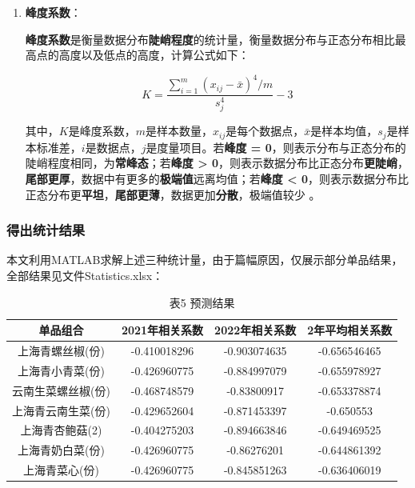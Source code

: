 \documentclass{article}
\begin{document}
\begin{enumerate}
		\item \textbf{峰度系数}：
		
		\textbf{峰度系数}是衡量数据分布\textbf{陡峭程度}的统计量，衡量数据分布与正态分布相比最高点的高度以及低点的高度，计算公式如下：
		
		\begin{equation}
			K = \frac{\sum_{i=1}^{m} (x_{ij} - \bar{x})^4 / m}{s_j^4} - 3
			\label{eq:k}
		\end{equation}
		
		其中，\(K\)是峰度系数，\(m\)是样本数量，\(x_{ij}\)是每个数据点，\(\bar{x}\)是样本均值，\(s_j\)是样本标准差，\(i\)是数据点，\(j\)是度量项目。若\textbf{峰度 = 0}，则表示分布与正态分布的陡峭程度相同，为\textbf{常峰态}；若\textbf{峰度 > 0}，则表示数据分布比正态分布\textbf{更陡峭}，\textbf{尾部更厚}，数据中有更多的\textbf{极端值}远离均值；若\textbf{峰度 < 0}，则表示数据分布比正态分布更\textbf{平坦}，\textbf{尾部更薄}，数据更加\textbf{分散}，极端值较少 \cite{3}。
	\end{enumerate}
	
	\subsubsection{得出统计结果}
	
	本文利用MATLAB求解上述三种统计量，由于篇幅原因，仅展示部分单品结果，全部结果见文件Statistics.xlsx：
	
	\renewcommand{\arraystretch}{1.5}
	\begin{table}[h!]
		\centering
		\caption{表5 预测结果}
		\begin{tabular}{cccc}
			\toprule[1.5pt]
			\textbf{单品组合} & \textbf{2021年相关系数} & \textbf{2022年相关系数} & \textbf{2年平均相关系数} \\
			\midrule
			上海青螺丝椒(份) & -0.410018296 & -0.903074635 & -0.656546465 \\
			上海青小青菜(份) & -0.426960775 & -0.884997079 & -0.655978927 \\
			云南生菜螺丝椒(份) & -0.468748579 & -0.83800917 & -0.653378874 \\
			上海青云南生菜(份) & -0.429652604 & -0.871453397 & -0.650553 \\
			上海青杏鲍菇(2) & -0.404275203 & -0.894663846 & -0.649469525 \\
			上海青奶白菜(份) & -0.426960775 & -0.86276201 & -0.644861392 \\
			上海青菜心(份) & -0.426960775 & -0.845851263 & -0.636406019 \\
			\bottomrule[1.5pt]
		\end{tabular}
	\end{table}
	
\end{document}
